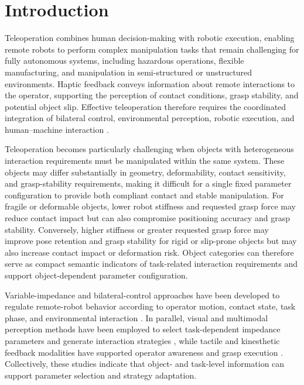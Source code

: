 \section{Introduction}

Teleoperation combines human decision-making with robotic execution, enabling remote robots to perform complex manipulation tasks that remain challenging for fully autonomous systems, including hazardous operations, flexible manufacturing, and manipulation in semi-structured or unstructured environments. Haptic feedback conveys information about remote interactions to the operator, supporting the perception of contact conditions, grasp stability, and potential object slip. Effective teleoperation therefore requires the coordinated integration of bilateral control, environmental perception, robotic execution, and human--machine interaction \cite{ref01,ref02}.

Teleoperation becomes particularly challenging when objects with heterogeneous interaction requirements must be manipulated within the same system. These objects may differ substantially in geometry, deformability, contact sensitivity, and grasp-stability requirements, making it difficult for a single fixed parameter configuration to provide both compliant contact and stable manipulation. For fragile or deformable objects, lower robot stiffness and requested grasp force may reduce contact impact but can also compromise positioning accuracy and grasp stability. Conversely, higher stiffness or greater requested grasp force may improve pose retention and grasp stability for rigid or slip-prone objects but may also increase contact impact or deformation risk. Object categories can therefore serve as compact semantic indicators of task-related interaction requirements and support object-dependent parameter configuration.

Variable-impedance and bilateral-control approaches have been developed to regulate remote-robot behavior according to operator motion, contact state, task phase, and environmental interaction \cite{ref05,ref06,ref07,ref08,ref09,ref18,ref19,ref20,ref21}. In parallel, visual and multimodal perception methods have been employed to select task-dependent impedance parameters and generate interaction strategies \cite{ref10,ref11,ref13,ref14}, while tactile and kinesthetic feedback modalities have supported operator awareness and grasp execution \cite{ref17,ref22,ref25}. Collectively, these studies indicate that object- and task-level information can support parameter selection and strategy adaptation.

